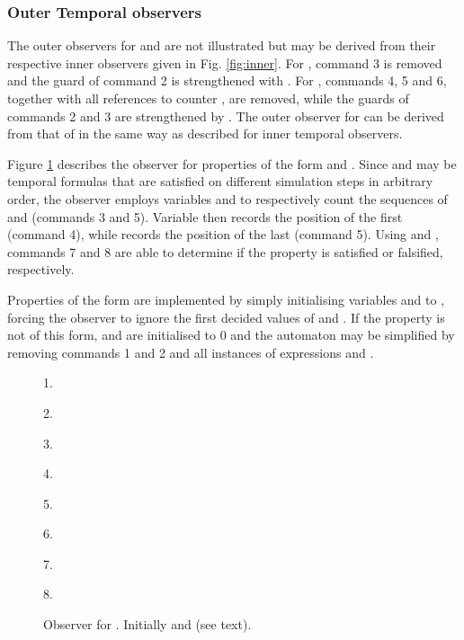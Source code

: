 \documentclass{llncs}
\begin{document}
\subsubsection*{Outer Temporal observers}

The outer observers for  and  are
not illustrated but may be derived from their respective inner observers
given in Fig. \ref{fig:inner}. For , command 3 is
removed and the guard of command 2 is strengthened with .
For , commands 4, 5 and 6, together with all references
to counter , are removed, while the guards of commands 2 and 3
are strengthened by . The outer observer for 
can be derived from that of  in the same way as described
for inner temporal observers.

Figure \ref{fig:Uouter} describes the observer for properties of
the form  and
. Since  and  may be temporal
formulas that are satisfied on different simulation steps in arbitrary
order, the observer employs variables  and  to respectively
count the sequences of  and  (commands 3 and 5).
Variable  then records the position of the first  (command
4), while  records the position of the last  (command
5). Using  and , commands 7 and 8 are able to determine
if the property is satisfied or falsified, respectively.

Properties of the form 
are implemented by simply initialising variables  and 
to , forcing the observer to ignore the first 
decided values of  and . If the property is not of this
form,  and  are initialised to 0 and the automaton may
be simplified by removing commands 1 and 2 and all instances of expressions
 and .

\begin{figure}
\begin{minipage}[c]{0.25\columnwidth}\centering
{}\end{minipage}\begin{minipage}[c]{0.74\columnwidth}1. 

2. 

3. 

4. 

5. 

6. 

7. 

8. 

\qquad{}\qquad{}\end{minipage}

\protect\caption{Observer for .
Initially  and 
(see text).\label{fig:Uouter}}
\end{figure}
\end{document}
